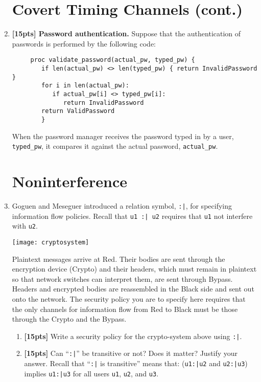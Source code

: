 \documentclass[12pt]{article}
\begin{document}
\begin{enumerate}
\newpage
\section*{Covert Timing Channels (cont.)}
\item {\textbf{[15pts] Password authentication.}} Suppose that the authentication of passwords is performed by the following code:
\begin{verbatim}
     proc validate_password(actual_pw, typed_pw) {
        if len(actual_pw) <> len(typed_pw) { return InvalidPassword }
        for i in len(actual_pw):
           if actual_pw[i] <> typed_pw[i]:
              return InvalidPassword
        return ValidPassword
        }
\end{verbatim}
When the password manager receives the password typed in by a user, \verb+typed_pw+, it compares it against the actual password, \verb+actual_pw+.

\newpage
\section{Noninterference}
\item[] Goguen and Meseguer introduced a relation symbol, \verb+:|+, for specifying information flow policies. Recall that \verb+u1 :| u2+ requires that \verb+u1+ not interfere with \verb+u2+. 
\begin{center}
\texttt{[image: cryptosystem]}
\end{center}
Plaintext messages arrive at Red. Their bodies are sent through the encryption device (Crypto) and their headers, which must remain in plaintext so that network switches can interpret them, are sent through Bypass. Headers and encrypted bodies are reassembled in the Black side and sent out onto the network. The security policy you are to specify here requires that the only channels for information flow from Red to Black must be those through the Crypto and the Bypass.
\begin{enumerate}
\item {\bf [15pts]} Write a security policy for the crypto-system above using \verb+:|+. 

\item {\bf [15pts]} Can ``\verb+:|+'' be transitive or not? Does it matter? Justify your answer. Recall that ``\verb+:|+ is transitive'' means that: (\verb+u1:|u2+ and \verb+u2:|u3+) implies \verb+u1:|u3+ for all users \verb+u1+, \verb+u2+, and \verb+u3+.
\end{enumerate}


\end{enumerate}
\end{document}
